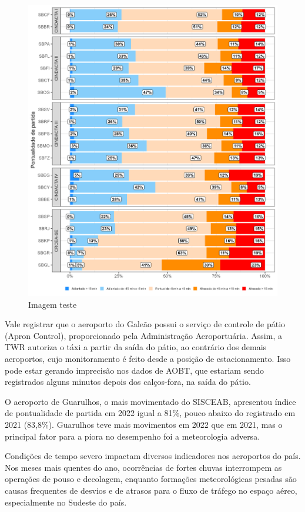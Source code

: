 \documentclass[
]{book}
\begin{document}
\begin{figure}
\centering
\includegraphics{imagens/gf41.png}
\caption{Imagem teste}
\end{figure}

Vale registrar que o aeroporto do Galeão possui o serviço de controle de pátio (Apron Control), proporcionado pela Administração Aeroportuária. Assim, a TWR autoriza o táxi a partir da saída do pátio, ao contrário dos demais aeroportos, cujo monitoramento é feito desde a posição de estacionamento. Isso pode estar gerando imprecisão nos dados de AOBT, que estariam sendo registrados alguns minutos depois dos calços-fora, na saída do pátio.

O aeroporto de Guarulhos, o mais movimentado do SISCEAB, apresentou índice de pontualidade de partida em 2022 igual a 81\%, pouco abaixo do registrado em 2021 (83,8\%). Guarulhos teve mais movimentos em 2022 que em 2021, mas o principal fator para a piora no desempenho foi a meteorologia adversa.

Condições de tempo severo impactam diversos indicadores nos aeroportos do país. Nos meses mais quentes do ano, ocorrências de fortes chuvas interrompem as operações de pouso e decolagem, enquanto formações meteorológicas pesadas são causas frequentes de desvios e de atrasos para o fluxo de tráfego no espaço aéreo, especialmente no Sudeste do país.
\end{document}
